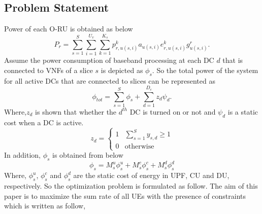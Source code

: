 \documentclass[conference]{IEEEtran}
\begin{document}
\subsection{Problem Statement}
Power of each O-RU is obtained as below
\begin{equation}
P_r =  \sum_{s=1}^{S} \sum_{i=1}^{U_v} \sum_{k=1}^{K_s}p_{r,u(s,i)}^{k}a_{u(s,i)} e^{k}_{r,u(s,i)}g_{u(s,i)}^r.
\end{equation}
Assume the power consumption of baseband processing at each DC $d$ that is connected to VNFs of a slice $s$ is depicted as
$\phi_{s}$. So the total power of the system for all active DCs that are connected to slices can be represented as
\begin{equation*}
\textstyle \phi_{tot} = \sum_{s=1}^{S}\phi_{s} + \sum_{d=1}^{D_c}z_d \psi_d .
\end{equation*}
Where,$z_d$ is shown that whether the $d^{th}$ DC is turned on or not and $\psi_d$ is a static cost when a DC is active.
\begin{equation}
  z_d =
    \begin{cases}
      1 & \sum_{s=1}^{S}y_{s,d} \geq 1 \\
      0 & \text{otherwise}
    \end{cases}       
\end{equation}  
In addition, $\phi_{s}$ is obtained from below
\begin{equation}
\phi_{s} = M_s^u \phi_s^u + M_s^c \phi_s^c+ M_s^d \phi_s^d
\end{equation}
Where, $\phi_s^u$, $\phi_s^c$ and $\phi_s^d$ are the static cost of energy in UPF, CU and DU, respectively. 
So the optimization problem is formulated as follow.
The aim of this paper is to maximize the sum rate of all UEs  with the presence of constraints which is written as follow,
\end{document}
